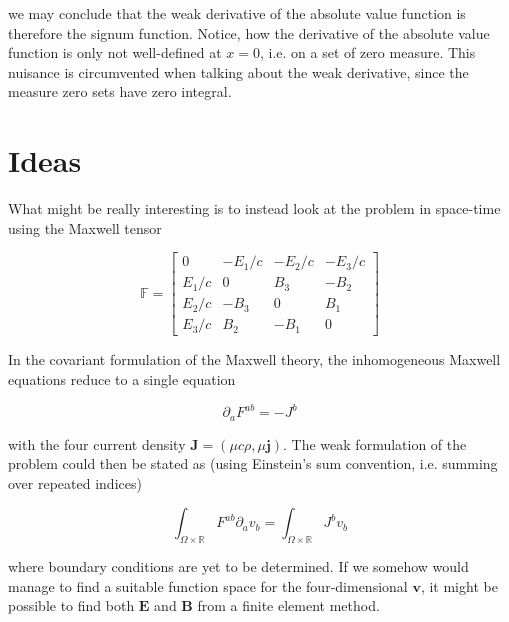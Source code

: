 \documentclass[11pt, a4paper]{article}
\begin{document}
we may conclude that the weak derivative of the absolute value function is therefore
the signum function. Notice, how the derivative of the absolute value function
is only not well-defined at $x=0$, i.e. on a set of zero measure. This nuisance
is circumvented when talking about the weak derivative, since the measure zero
sets have zero integral.

\section{Ideas}
\label{sec:ideas}

What might be really interesting is to instead look at the problem in space-time 
using the Maxwell tensor

\begin{equation}
    \mathbb{F} = \begin{bmatrix}
        0 & -E_1/c & -E_2/c & -E_3/c \\
        E_1/c & 0 & B_3 & -B_2 \\ 
        E_2/c & -B_3 & 0 & B_1 \\ 
        E_3/c & B_2 & -B_1 & 0
    \end{bmatrix}
\end{equation}

In the covariant formulation of the Maxwell theory, the inhomogeneous Maxwell
equations reduce to a single equation

\begin{equation}
    \partial_a F^{ab} = - J^b
\end{equation}

with the four current density $\mathbf{J} = (\mu c \rho, \mu \mathbf{j})$. The 
weak formulation of the problem could then be stated as (using Einstein's sum
convention, i.e. summing over repeated indices)

\begin{equation}
    \int_{\Omega \times \mathbb{R}} F^{ab} \partial_a v_b = \int_{\Omega \times \mathbb{R}} J^b v_b
\end{equation}

where boundary conditions are yet to be determined. If we somehow would manage
to find a suitable function space for the four-dimensional $\mathbf{v}$, it might 
be possible to find both $\mathbf{E}$ and $\mathbf{B}$ from a finite element method.


\end{document}
